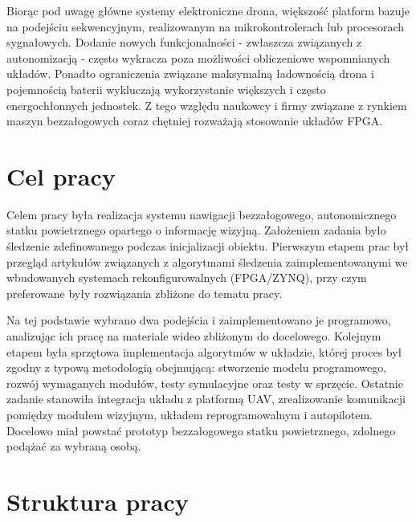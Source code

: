 Biorąc pod uwagę główne systemy elektroniczne drona, większość platform bazuje na podejściu sekwencyjnym, realizowanym na mikrokontrolerach lub procesorach sygnałowych. Dodanie nowych funkcjonalności - zwłaszcza związanych z autonomizacją - często wykracza poza możliwości obliczeniowe wspomnianych układów. Ponadto ograniczenia związane maksymalną ładownością drona i pojemnością baterii wykluczają wykorzystanie większych i często energochłonnych jednostek.  Z tego względu naukowcy i firmy związane z rynkiem maszyn bezzałogowych coraz chętniej rozważają stosowanie układów FPGA.


\section{Cel pracy}

Celem pracy była realizacja systemu nawigacji bezzałogowego, 
autonomicznego statku powietrznego opartego o informację wizyjną. 
Założeniem zadania było śledzenie zdefinowanego podczas inicjalizacji obiektu. 
Pierwszym etapem prac był przegląd artykułów związanych z algorytmami śledzenia 
zaimplementowanymi we wbudowanych systemach rekonfigurowalnych 
(FPGA/ZYNQ), przy czym preferowane były rozwiązania zbliżone do tematu pracy. 

Na tej podstawie wybrano dwa podejścia i zaimplementowano je programowo, 
analizując ich pracę na materiale wideo zbliżonym do docelowego. 
Kolejnym etapem była sprzętowa implementacja algorytmów w układzie, 
której proces był zgodny z typową metodologią obejmującą: stworzenie modelu programowego, 
rozwój wymaganych modułów, testy symulacyjne oraz testy w sprzęcie.
Ostatnie zadanie stanowiła integracja układu z platformą UAV, 
zrealizowanie komunikacji pomiędzy modułem wizyjnym, 
układem reprogramowalnym i autopilotem. 
Docelowo miał powstać prototyp bezzałogowego statku powietrznego, zdolnego podążać za wybraną osobą.





\section{Struktura pracy}

